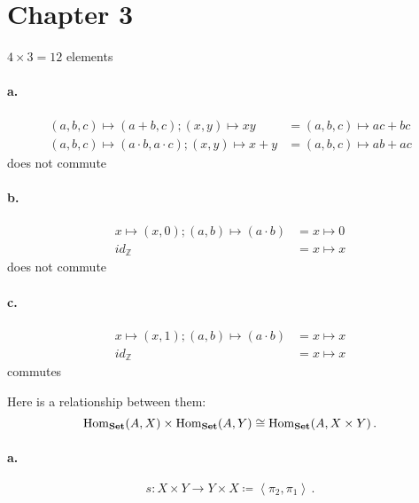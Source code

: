 \section*{Chapter 3}


$4 \times 3 = 12$ elements


\paragraph{a.}
\begin{align*}
  (a,b,c)\mapsto(a+b,c); (x,y)\mapsto xy
  &= (a,b,c)\mapsto ac+bc \\
  (a,b,c)\mapsto(a\cdot b,a\cdot c); (x,y)\mapsto x+y
  &= (a,b,c)\mapsto ab+ac
\end{align*}
does not commute
\paragraph{b.}
\begin{align*}
  x\mapsto(x,0); (a,b)\mapsto(a\cdot b) &= x\mapsto 0 \\
  id_\mathbb{Z} &= x\mapsto x
\end{align*}
does not commute
\paragraph{c.}
\begin{align*}
  x\mapsto(x,1); (a,b)\mapsto(a\cdot b) &= x\mapsto x \\
  id_\mathbb{Z} &= x\mapsto x
\end{align*}
commutes


Here is a relationship between them:
\begin{equation*}
  \mathrm{Hom}_{\mathbf{Set}}(A,X) \times \mathrm{Hom}_{\mathbf{Set}}(A,Y) \cong \mathrm{Hom}_{\mathbf{Set}}(A,X \times Y)\,.
\end{equation*}


\paragraph{a.}
\begin{equation*}
  s \colon X \times Y \to Y \times X \coloneqq
  \left\langle \pi_2 , \pi_1 \right\rangle \,.
\end{equation*}
